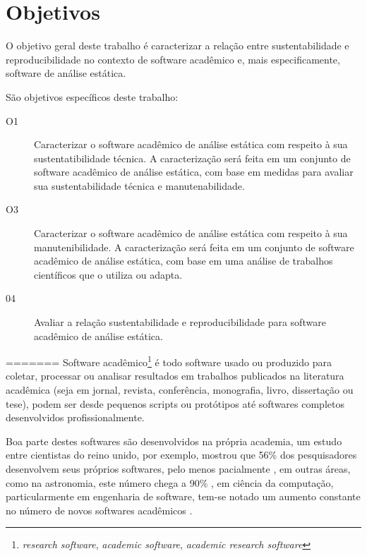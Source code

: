 \section{Objetivos}

O objetivo geral deste trabalho é caracterizar a relação entre sustentabilidade e reproducibilidade no contexto de software acadêmico e, mais especificamente, software de análise estática. 


São objetivos específicos deste trabalho:
\begin{description}
  \item[O1] Caracterizar o software acadêmico de análise estática com respeito à sua sustentatibilidade técnica.
A caracterização será feita em um conjunto de software acadêmico de análise estática, com base em medidas para avaliar
sua sustentabilidade técnica e manutenabilidade.
  \item[O3] Caracterizar o software acadêmico de análise estática com respeito à sua manutenibilidade.
A caracterização será feita em um conjunto de software acadêmico de análise estática, com base em uma análise de trabalhos científicos que o utiliza ou adapta.
  \item[04] Avaliar a relação sustentabilidade e reproducibilidade para software acadêmico de análise estática.
\end{description}
=======
Software acadêmico\footnote{{\it research software}, {\it academic software},
{\it academic research software}} é todo software usado ou produzido para
coletar, processar ou analisar resultados em trabalhos publicados na literatura
acadêmica (seja em jornal, revista, conferência, monografia, livro, dissertação
ou tese), podem ser desde pequenos scripts ou protótipos até softwares
completos desenvolvidos profissionalmente.

Boa parte destes softwares são desenvolvidos na própria academia, um estudo
entre cientistas do reino unido, por exemplo, mostrou que 56\% dos
pesquisadores desenvolvem seus próprios softwares, pelo menos pacialmente
\cite{hettrick_2014_14809}, em outras áreas, como na astronomia, este número
chega a 90\% \cite{momcheva2015software}, em ciência da computação,
particularmente em engenharia de software, tem-se notado um aumento constante
no número de novos softwares acadêmicos \cite{allen2017engineering}.

